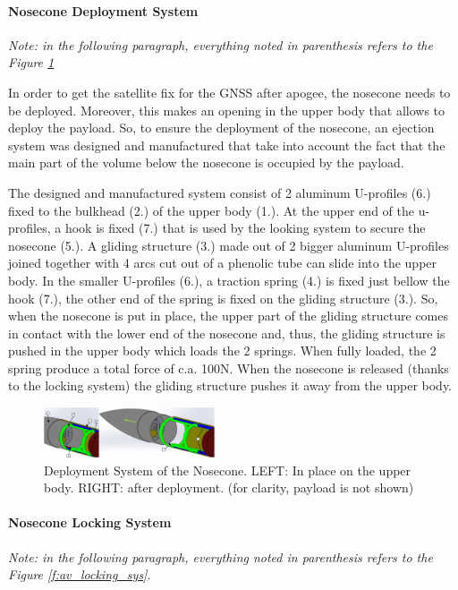 \paragraph{Nosecone Deployment System}
 \hfill \break
\textit{Note: in the following paragraph, everything noted in parenthesis refers to the Figure \ref{f:av_deployment_sys}}

In order to get the satellite fix for the GNSS after apogee, the nosecone needs to be deployed. Moreover, this makes an opening in the upper body that allows to deploy the payload. So, to ensure the deployment of the nosecone, an ejection system was designed and manufactured that take into account the fact that the
main part of the volume below the nosecone is occupied by the payload.

The designed and manufactured system consist of 2 aluminum U-profiles (6.) fixed to the bulkhead (2.) of the upper body (1.). At the upper end of the u-profiles, a hook is fixed (7.) that is used by the looking system to secure the nosecone (5.). A gliding structure (3.) made out of 2 bigger aluminum U-profiles joined together with 4 arcs cut out of a phenolic tube can slide into the upper body.
In the smaller U-profiles (6.), a traction spring (4.) is fixed just bellow the hook (7.), the other end of the spring is fixed on the gliding structure (3.). So, when the nosecone is put in place, the upper part of the gliding structure comes in contact with the lower end of the nosecone and, thus, the gliding structure is pushed in the upper body which loads the 2 springs. When fully loaded, the 2 spring produce a total force of c.a. 100N. When the nosecone is released (thanks to the locking system) the gliding structure pushes it away from the upper body.

  \begin{figure}[h!]
 	\centering
        \includegraphics[width=0.45\textwidth]{img/AV_FIG_CAD_depl_sys_1.jpg}
        \caption{Deployment System of the Nosecone. LEFT: In place on the upper body. RIGHT: after deployment. (for clarity, payload is not shown)}
        \label{f:av_deployment_sys}
 \end{figure}

\paragraph{Nosecone Locking System}
 \hfill \break
\textit{Note: in the following paragraph, everything noted in parenthesis refers to the Figure \ref{f:av_locking_sys}}.

